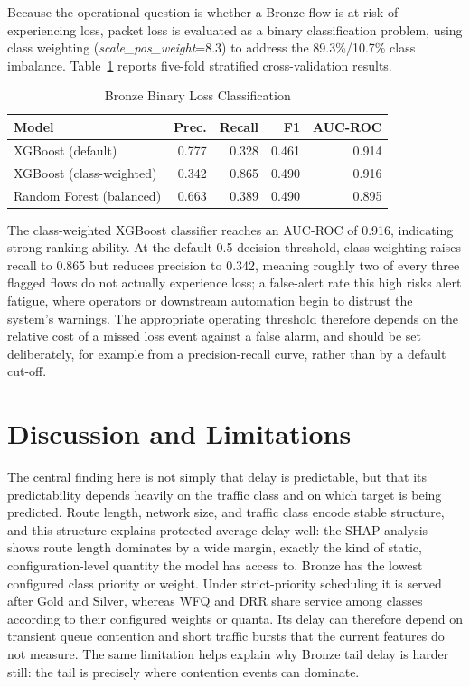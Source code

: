 \documentclass[conference]{IEEEtran}
\begin{document}
Because the operational question is whether a Bronze flow is at risk of experiencing loss, packet loss is evaluated as a binary classification problem, using class weighting (\emph{scale\_pos\_weight}=8.3) to address the 89.3\%/10.7\% class imbalance. Table~\ref{tab:bronze_loss} reports five-fold stratified cross-validation results.

\begin{table}[t]
\caption{Bronze Binary Loss Classification}
\label{tab:bronze_loss}
\centering
\setlength{\tabcolsep}{4pt}
\begin{tabular}{lrrrr}
\toprule
Model & Prec. & Recall & F1 & AUC-ROC \\
\midrule
XGBoost (default)        & 0.777 & 0.328 & 0.461 & 0.914 \\
XGBoost (class-weighted) & 0.342 & 0.865 & 0.490 & 0.916 \\
Random Forest (balanced) & 0.663 & 0.389 & 0.490 & 0.895 \\
\bottomrule
\end{tabular}
\end{table}

The class-weighted XGBoost classifier reaches an AUC-ROC of 0.916, indicating strong ranking ability. At the default 0.5 decision threshold, class weighting raises recall to 0.865 but reduces precision to 0.342, meaning roughly two of every three flagged flows do not actually experience loss; a false-alert rate this high risks alert fatigue, where operators or downstream automation begin to distrust the system's warnings. The appropriate operating threshold therefore depends on the relative cost of a missed loss event against a false alarm, and should be set deliberately, for example from a precision-recall curve, rather than by a default cut-off.

\section{Discussion and Limitations}

The central finding here is not simply that delay is predictable, but that its predictability depends heavily on the traffic class and on which target is being predicted. Route length, network size, and traffic class encode stable structure, and this structure explains protected average delay well: the SHAP analysis shows route length dominates by a wide margin, exactly the kind of static, configuration-level quantity the model has access to. Bronze has the lowest configured class priority or weight. Under strict-priority scheduling it is served after Gold and Silver, whereas WFQ and DRR share service among classes according to their configured weights or quanta. Its delay can therefore depend on transient queue contention and short traffic bursts that the current features do not measure. The same limitation helps explain why Bronze tail delay is harder still: the tail is precisely where contention events can dominate.
\end{document}

